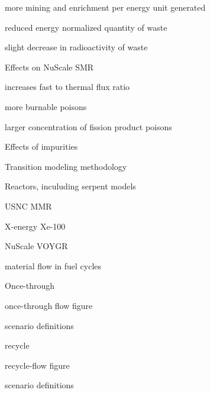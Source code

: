 \documentclass{report}
\begin{document}
\begin{outline}
\begin{outline}
\begin{outline}
\begin{outline}
            \item more mining and enrichment per energy unit generated
            \item reduced energy normalized quantity of waste
            \item slight decrease in radioactivity of waste
        \end{outline}
        \item Effects on NuScale SMR \cite{carlson_implications_2022}
        \begin{outline}
            \item increases fast to thermal flux ratio
            \item more burnable poisons
            \item larger concentration of fission product poisons
        \end{outline}
        \item Effects of impurities \cite{celikten_effects_2021}
    \end{outline}
\end{outline}

\item Transition modeling methodology
\begin{outline}
    \item Reactors, inculuding serpent models
    \begin{outline}
        \item USNC MMR \cite{hussain_advances_2018}
        \item X-energy Xe-100 \cite{harlan_x-energy_2018}
        \item NuScale VOYGR \cite{nuscale_chapter_2018,suk_simulation_2021}
    \end{outline}
    \item material flow in fuel cycles
    \begin{outline}
        \item Once-through
        \begin{outline}
            \item once-through flow figure
            \item scenario definitions
        \end{outline}
        \item recycle 
        \begin{outline}
            \item recycle-flow figure          
            \item scenario definitions
        \end{outline}


\end{outline}
\end{outline}
\end{outline}
\end{document}
